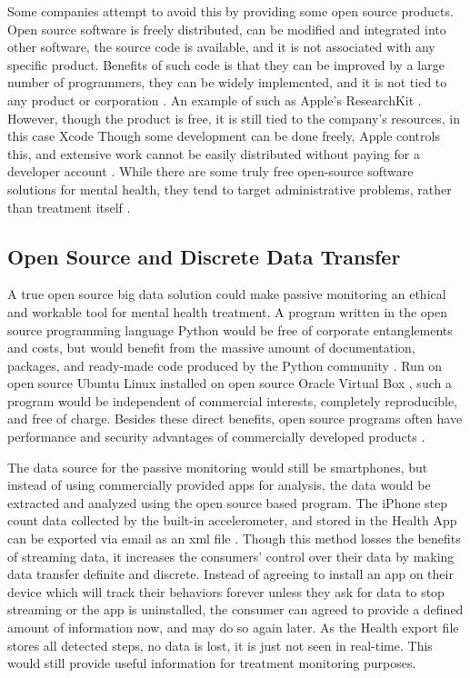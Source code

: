 \documentclass[sigconf]{acmart}
\begin{document}
Some companies  attempt to avoid this by providing some open source products. Open source software is freely distributed, can be modified and integrated into other software, the source code is available, and it is not associated with any specific product. Benefits of such code is that they can be improved by a large number of programmers, they can be widely implemented, and it is not tied to any product or corporation \cite{opensourceinit}. An example of such as Apple's ResearchKit \cite{researchkit}.  However, though the product is free, it is still tied to the company's resources, in this case Xcode \cite{setupresearchkit} Though some development can be done freely, Apple controls this, and extensive work cannot be easily distributed without paying for a developer account \cite{appledeveloper}. While there are some truly free open-source software solutions for mental health, they tend to target administrative problems, rather than treatment itself \cite{topopenmental}.

\subsection{Open Source and Discrete Data Transfer}

A true open source big data solution could make passive monitoring an ethical and workable tool for mental health treatment. A program written in the open source programming language Python would be free of corporate entanglements and costs, but would benefit from the massive amount of documentation, packages, and ready-made code produced by the Python community \cite{pythonfoundation}. Run on open source Ubuntu Linux \cite{ubuntu} installed on open source Oracle Virtual Box \cite{virtualbox}, such a program would be independent of commercial interests, completely reproducible, and free of charge. Besides these direct benefits, open source programs often have performance and security advantages of commercially developed products \cite{opensourcereasons}.

The data source for the passive monitoring would still be smartphones, but instead of using commercially provided apps for analysis, the data would be extracted and analyzed using the open source based program. The iPhone step count data collected by the built-in accelerometer, and stored in the Health App can be exported via email as an xml file \cite{howtoexporthealth}. Though this method losses the benefits of streaming data, it increases the consumers' control over their data by making data transfer definite and discrete. Instead of agreeing to install an app on their device which will track their behaviors forever unless they ask for data to stop streaming or the app is uninstalled, the consumer can agreed to provide a defined amount of information now, and may do so again later. As the Health export file stores all detected steps, no data is lost, it is just not seen in real-time. This would still provide useful information for treatment monitoring purposes. 
\end{document}
